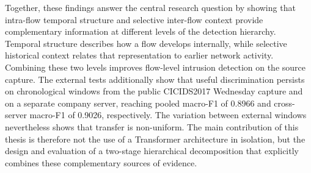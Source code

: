 \documentclass[11pt,fleqn]{report}
\begin{document}
Together, these findings answer the central research question by showing that intra-flow temporal structure and selective inter-flow context provide complementary information at different levels of the detection hierarchy. Temporal structure describes how a flow develops internally, while selective historical context relates that representation to earlier network activity. Combining these two levels improves flow-level intrusion detection on the source capture. The external tests additionally show that useful discrimination persists on chronological windows from the public CICIDS2017 Wednesday capture and on a separate company server, reaching pooled macro-F1 of 0.8966 and cross-server macro-F1 of 0.9026, respectively. The variation between external windows nevertheless shows that transfer is non-uniform. The main contribution of this thesis is therefore not the use of a Transformer architecture in isolation, but the design and evaluation of a two-stage hierarchical decomposition that explicitly combines these complementary sources of evidence.



\end{document}
